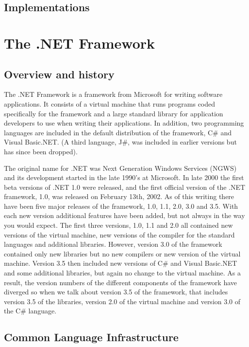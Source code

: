 \subsection{Implementations}


	
\section{The .NET Framework}

\subsection{Overview and history}
	The .NET Framework is a framework from Microsoft for writing software 
	applications. It consists of a virtual machine that runs programs coded 
	specifically for the framework and a large standard library for application 
	developers to use when writing their applications. In addition, two 
	programming languages are included in the default distribution of the 
	framework, C\# and Visual Basic.NET. (A third language, J\#, was included in
	earlier versions but has since been dropped).

	The original name for .NET was Next Generation Windows Services (NGWS) and its
	development started in the late 1990's at Microsoft. In late 2000 the first 
	beta versions of .NET 1.0 were released, and the first official version of the
	.NET framework, 1.0, was released on February 13th, 2002. As of this writing 
	there have been five major releases of the framework, 1.0, 1.1, 2.0, 3.0 and 
	3.5. With each new version additional features have been added, but not always 
	in the way you would expect. The first three versions, 1.0, 1.1 and 2.0 all 
	contained new versions of the virtual machine, new versions of the compiler 
	for the standard languages and additional libraries. However, version 3.0 of 
	the framework contained only new libraries but no new compilers or new version 
	of the virtual machine. Version 3.5 then included new versions of C\# and 
	Visual Basic.NET and some additional libraries, but again no change to the 
	virtual machine. As a result, the version numbers of the different components 
	of the framework have diverged so when we talk about version 3.5 of the 
	framework, that includes version 3.5 of the libraries, version 2.0 of the 
	virtual machine and version 3.0 of the C\# language. 

\subsection{Common Language Infrastructure}

